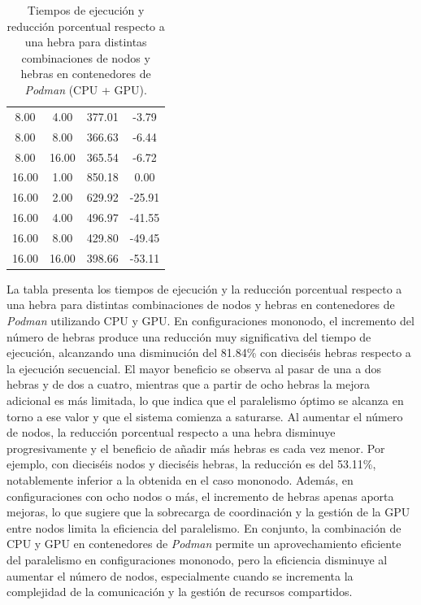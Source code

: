 \begin{table}[ht]
\begin{tabular}{|c|c|c|c|}
        8.00           & 4.00            & 377.01              & -3.79                          \\
        8.00           & 8.00            & 366.63              & -6.44                          \\
        8.00           & 16.00           & 365.54              & -6.72                          \\
        16.00          & 1.00            & 850.18              & 0.00                           \\
        16.00          & 2.00            & 629.92              & -25.91                         \\
        16.00          & 4.00            & 496.97              & -41.55                         \\
        16.00          & 8.00            & 429.80              & -49.45                         \\
        16.00          & 16.00           & 398.66              & -53.11                         \\
        \hline
    \end{tabular}
    \caption{Tiempos de ejecución y reducción porcentual respecto a una hebra para distintas combinaciones de nodos y hebras en contenedores de \textit{Podman} (CPU + GPU).}
    \label{tab:thread_sweep_ubuntu_\textit{Podman}_gpu_time}
\end{table}

La tabla presenta los tiempos de ejecución y la reducción porcentual respecto a una hebra para distintas combinaciones de nodos y hebras en contenedores de \textit{Podman} utilizando CPU y GPU. En configuraciones mononodo, el incremento del número de hebras produce una reducción muy significativa del tiempo de ejecución, alcanzando una disminución del 81.84\% con dieciséis hebras respecto a la ejecución secuencial. El mayor beneficio se observa al pasar de una a dos hebras y de dos a cuatro, mientras que a partir de ocho hebras la mejora adicional es más limitada, lo que indica que el paralelismo óptimo se alcanza en torno a ese valor y que el sistema comienza a saturarse. Al aumentar el número de nodos, la reducción porcentual respecto a una hebra disminuye progresivamente y el beneficio de añadir más hebras es cada vez menor. Por ejemplo, con dieciséis nodos y dieciséis hebras, la reducción es del 53.11\%, notablemente inferior a la obtenida en el caso mononodo. Además, en configuraciones con ocho nodos o más, el incremento de hebras apenas aporta mejoras, lo que sugiere que la sobrecarga de coordinación y la gestión de la GPU entre nodos limita la eficiencia del paralelismo. En conjunto, la combinación de CPU y GPU en contenedores de \textit{Podman} permite un aprovechamiento eficiente del paralelismo en configuraciones mononodo, pero la eficiencia disminuye al aumentar el número de nodos, especialmente cuando se incrementa la complejidad de la comunicación y la gestión de recursos compartidos.

